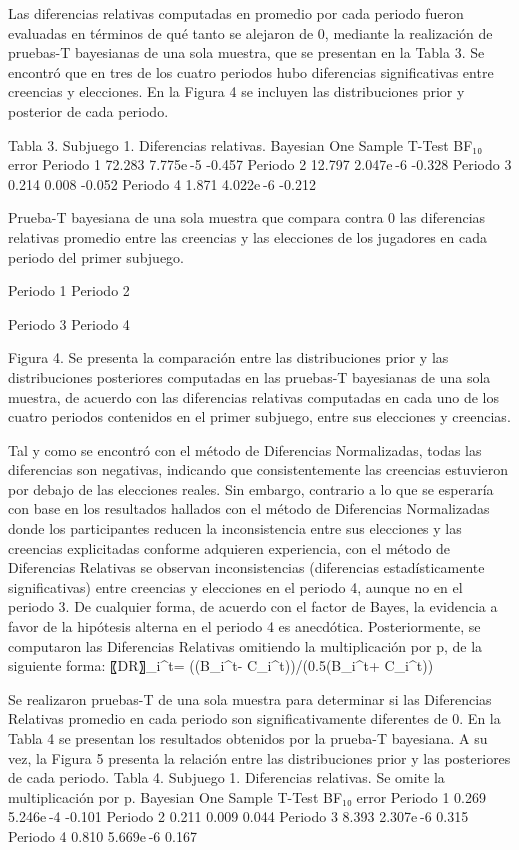 Las diferencias relativas computadas en promedio por cada periodo fueron evaluadas en términos de qué tanto se alejaron de 0, mediante la realización de pruebas-T bayesianas de una sola muestra, que se presentan en la Tabla 3. Se encontró que en tres de los cuatro periodos hubo diferencias significativas entre creencias y elecciones. En la Figura 4 se incluyen las distribuciones prior y posterior de cada periodo.




Tabla 3. Subjuego 1. Diferencias relativas.
Bayesian One Sample T-Test 	
  	BF₁₀ 	error %
Periodo 1 		72.283 		7.775e -5 		-0.457
Periodo 2 		12.797 		2.047e -6 		-0.328
Periodo 3 		0.214 		0.008 		-0.052
Periodo 4 		1.871 		4.022e -6 		-0.212
	
Prueba-T bayesiana de una sola muestra que compara contra 0 las diferencias relativas promedio entre las creencias y las elecciones de los jugadores en cada periodo del primer subjuego.

  
Periodo 1					Periodo 2
  
Periodo 3					Periodo 4

Figura 4. Se presenta la comparación entre las distribuciones prior y las distribuciones posteriores computadas en las pruebas-T bayesianas de una sola muestra, de acuerdo con las diferencias relativas computadas en cada uno de los cuatro periodos contenidos en el primer subjuego, entre sus elecciones y creencias.

Tal y como se encontró con el método de Diferencias Normalizadas, todas las diferencias son negativas, indicando que consistentemente las creencias estuvieron por debajo de las elecciones reales. Sin embargo, contrario a lo que se esperaría con base en los resultados hallados con el método de Diferencias Normalizadas donde los participantes reducen la inconsistencia entre sus elecciones y las creencias explicitadas conforme adquieren experiencia, con el método de Diferencias Relativas se observan inconsistencias (diferencias estadísticamente significativas) entre creencias y elecciones en el periodo 4, aunque no en el periodo 3. De cualquier forma, de acuerdo con el factor de Bayes, la evidencia a favor de la hipótesis alterna en el periodo 4 es anecdótica.
Posteriormente, se computaron las Diferencias Relativas omitiendo la multiplicación por p, de la siguiente forma:
〖DR〗_i^t=  ((B_i^t- C_i^t))/(0.5(B_i^t+ C_i^t))

Se realizaron pruebas-T de una sola muestra para determinar si las Diferencias Relativas promedio en cada periodo son significativamente diferentes de 0. En la Tabla 4 se presentan los resultados obtenidos por la prueba-T bayesiana. A su vez, la Figura 5 presenta la relación entre las distribuciones prior y las posteriores de cada periodo.
Tabla 4. Subjuego 1. Diferencias relativas. Se omite la multiplicación por p.
Bayesian One Sample T-Test 	
  	BF₁₀ 	error %
Periodo 1 		0.269 		5.246e -4 		-0.101 
Periodo 2 		0.211 		0.009 		0.044 
Periodo 3 		8.393 		2.307e -6 		0.315 
Periodo 4 		0.810 		5.669e -6 		0.167 
	
